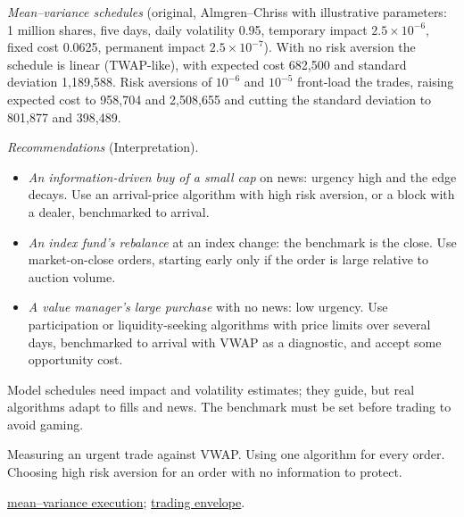 \begin{qfmethod}
 \emph{Mean--variance schedules} (original, Almgren--Chriss with illustrative parameters: 1 million shares, five days, daily volatility 0.95, temporary impact $2.5\times10^{-6}$, fixed cost 0.0625, permanent impact $2.5\times10^{-7}$). With no risk aversion the schedule is linear (TWAP-like), with expected cost 682{,}500 and standard deviation 1{,}189{,}588. Risk aversions of $10^{-6}$ and $10^{-5}$ front-load the trades, raising expected cost to 958{,}704 and 2{,}508{,}655 and cutting the standard deviation to 801{,}877 and 398{,}489.

\emph{Recommendations} (Interpretation).
\begin{itemize}
\item \emph{An information-driven buy of a small cap} on news: urgency high and the edge decays. Use an arrival-price algorithm with high risk aversion, or a block with a dealer, benchmarked to arrival.
\item \emph{An index fund's rebalance} at an index change: the benchmark is the close. Use market-on-close orders, starting early only if the order is large relative to auction volume.
\item \emph{A value manager's large purchase} with no news: low urgency. Use participation or liquidity-seeking algorithms with price limits over several days, benchmarked to arrival with VWAP as a diagnostic, and accept some opportunity cost.
\end{itemize}

 Model schedules need impact and volatility estimates; they guide, but real algorithms adapt to fills and news. The benchmark must be set before trading to avoid gaming.

 Measuring an urgent trade against VWAP. Using one algorithm for every order. Choosing high risk aversion for an order with no information to protect.

 \hyperref[mod:almgren-chriss-execution]{mean--variance execution}; \hyperref[def:trading-envelope]{trading envelope}.

\end{qfmethod}

